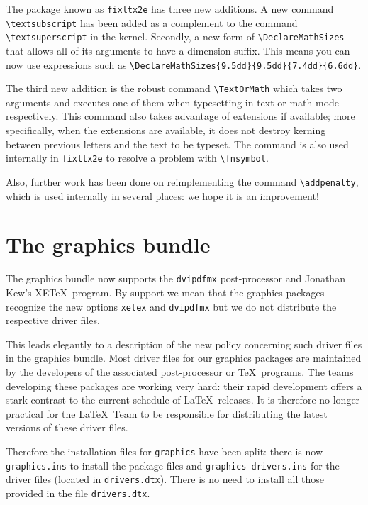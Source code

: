 \documentclass{ltnews}
\providecommand\pkg[1]{\texttt{#1}}
\providecommand\option[1]{\texttt{#1}}
\providecommand\file[1]{\texttt{#1}}
\begin{document}
The package known as \pkg{fixltx2e} has three new additions. A new
command \verb|\textsubscript| has been added as a complement to the
command \verb|\textsuperscript| in the kernel.  Secondly, a new form of
\verb|\DeclareMathSizes| that allows all of its arguments to have a
dimension suffix.  This means you can now use expressions such as
\verb|\DeclareMathSizes{9.5dd}{9.5dd}{7.4dd}{6.6dd}|.

The third new
addition is the robust command \verb|\TextOrMath| which takes two
arguments and executes one of them when typesetting in text or math
mode respectively. This command also takes advantage of \eTeX{}
extensions if available; more specifically,
when the \eTeX{} extensions are available, it does not
destroy kerning between previous letters and the text to be typeset.
The command is also used
internally in \pkg{fixltx2e} to resolve a problem with
\verb|\fnsymbol|.

Also, further work has been done on reimplementing
the command \verb|\addpenalty|, which is used internally in several
places: we hope it is an improvement!

\section{The graphics bundle}

The \textsf{graphics} bundle now supports the
\texttt{dvipdfmx} post-processor and Jonathan Kew's XE\TeX\
program. By support we mean that the graphics packages recognize the
new options \option{xetex} and \option{dvipdfmx} but we do not
distribute the respective driver files.

This leads elegantly to a description of the
new policy concerning such driver files in the \textsf{graphics} bundle.
Most driver files for our graphics packages are maintained by the
developers of the associated post-processor or \TeX\ programs.
The teams developing these packages are working very hard: their rapid
development offers a stark contrast to the current schedule of \LaTeX\
releases.  It is therefore no longer practical
for the \LaTeX\ Team to be responsible for distributing the
latest versions of these driver files.

Therefore the installation files for \pkg{graphics} have been
split: there is now \file{graphics.ins} to install the package files and
\file{graphics-drivers.ins} for the driver files (located in
\file{drivers.dtx}).
There is no need
to install all those provided in the file \file{drivers.dtx}.
\end{document}
